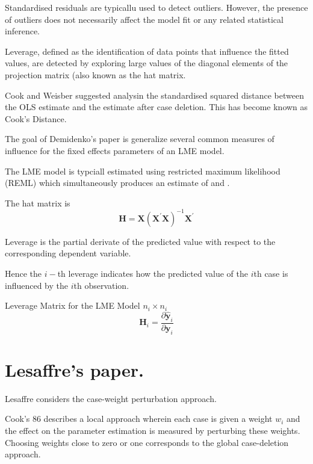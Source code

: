 \documentclass[MAIN.tex]{subfiles}
\begin{document}

Standardised residuals are typicallu used to detect outliers. However, the presence of outliers does not necessarily affect the model fit or any related statistical inference.

Leverage, defined as the identification of data points that influence the fitted values, are detected by exploring large values of the diagonal elements of the projection matrix (also known as the hat matrix.

Cook and Weisber suggested analysin the standardised squared distance between the OLS estimate and the estimate after case deletion. This has become known as Cook's Distance.

The goal of Demidenko's paper is generalize several common measures of influence for the fixed effects parameters of an LME model.



The LME model is typciall estimated using restricted maximum likelihood (REML) which simultaneously produces an estimate of  and \boldsymbol{\beta}.

The hat matrix is 
\[\boldsymbol{H}  =  \boldsymbol{X} (\boldsymbol{X}^{\prime}\boldsymbol{X})^{-1}\boldsymbol{X} ^{\prime} \]

Leverage is the partial derivate of  the predicted value with respect to the corresponding dependent variable.

Hence the $i-$th leverage indicates how the predicted value of the $i$th case is influenced by the $i$th observation.


Leverage Matrix  for the LME Model $n_i \times n_i$
\[ \boldsymbol{H}_i = \frac{ \partial \hat{\boldsymbol{y}}_i } {\partial \boldsymbol{y}_i } \]

\section{Lesaffre's paper.} %

Lesaffre considers the case-weight perturbation approach.


Cook's 86 describes a local approach wherein each case is given a
weight $w_{i}$ and the effect on the parameter estimation is
measured by perturbing these weights. Choosing weights close to
zero or one corresponds to the global case-deletion approach.
\end{document}
